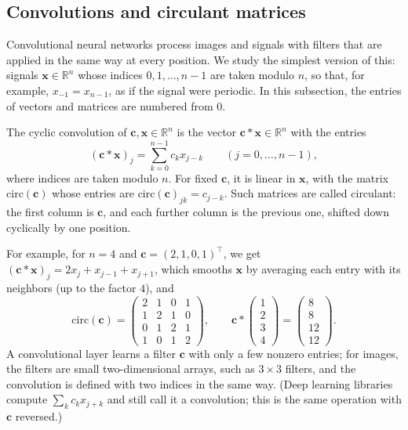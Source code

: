\subsection{Convolutions and circulant matrices}\label{L1-subsec:circulant}

Convolutional neural networks process images and signals with filters that are applied in the same way at every position. We study the simplest version of this: signals $\mathbf{x} \in \mathbb{R}^n$ whose indices $0, 1, \ldots, n - 1$ are taken modulo $n$, so that, for example, $x_{-1} = x_{n-1}$, as if the signal were periodic. In this subsection, the entries of vectors and matrices are numbered from $0$.

\begin{definition}\label{L1-def:circulant}
    The cyclic convolution of $\mathbf{c}, \mathbf{x} \in \mathbb{R}^n$ is the vector $\mathbf{c} \ast \mathbf{x} \in \mathbb{R}^n$ with the entries
    \[(\mathbf{c} \ast \mathbf{x})_j = \sum_{k=0}^{n-1} c_kx_{j-k} \qquad (j = 0, \ldots, n - 1),\]
    where indices are taken modulo $n$. For fixed $\mathbf{c}$, it is linear in $\mathbf{x}$, with the matrix $\mathrm{circ}(\mathbf{c})$ whose entries are $\mathrm{circ}(\mathbf{c})_{jk} = c_{j-k}$. Such matrices are called circulant: the first column is $\mathbf{c}$, and each further column is the previous one, shifted down cyclically by one position.
\end{definition}

For example, for $n = 4$ and $\mathbf{c} = (2, 1, 0, 1)^\top$, we get $(\mathbf{c} \ast \mathbf{x})_j = 2x_j + x_{j-1} + x_{j+1}$, which smooths $\mathbf{x}$ by averaging each entry with its neighbors (up to the factor $4$), and
\[\mathrm{circ}(\mathbf{c}) = \begin{pmatrix} 2 & 1 & 0 & 1 \\ 1 & 2 & 1 & 0 \\ 0 & 1 & 2 & 1 \\ 1 & 0 & 1 & 2 \end{pmatrix}, \qquad \mathbf{c} \ast \begin{pmatrix} 1 \\ 2 \\ 3 \\ 4 \end{pmatrix} = \begin{pmatrix} 8 \\ 8 \\ 12 \\ 12 \end{pmatrix}.\]
A convolutional layer learns a filter $\mathbf{c}$ with only a few nonzero entries; for images, the filters are small two-dimensional arrays, such as $3 \times 3$ filters, and the convolution is defined with two indices in the same way. (Deep learning libraries compute $\sum_k c_kx_{j+k}$ and still call it a convolution; this is the same operation with $\mathbf{c}$ reversed.)

